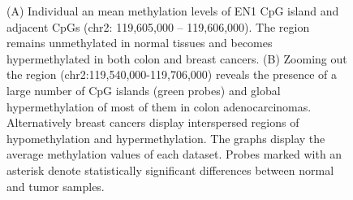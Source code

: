 \documentclass{bmcart}
\begin{document}
\begin{backmatter}
\begin{figure}[h!]
  \caption{
(A) Individual an mean methylation levels of EN1 CpG island and adjacent CpGs (chr2: 119,605,000 – 119,606,000). The region remains unmethylated in normal tissues and becomes hypermethylated in both colon and breast cancers. (B) Zooming out the region (chr2:119,540,000-119,706,000) reveals the presence of a large number of CpG islands (green probes) and global hypermethylation of most of them in colon adenocarcinomas. Alternatively breast cancers display interspersed regions of hypomethylation and hypermethylation. The graphs display the average methylation values of each dataset. Probes marked with an asterisk denote statistically significant differences between normal and tumor samples. 
}
  \label{fig:4}
\end{figure}









\end{backmatter}
\end{document}
